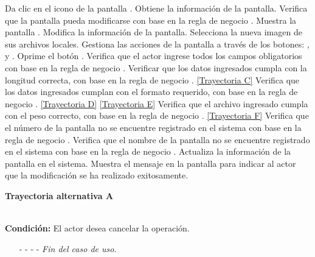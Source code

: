 	\begin{UCtrayectoria}
		\UCpaso[\UCactor] Da clic en el icono \editar de la pantalla .
		\UCpaso[\UCsist] Obtiene la información de la pantalla.
		\UCpaso[\UCsist] Verifica que la pantalla pueda modificarse con base en la regla de negocio . 
		\UCpaso[\UCsist] Muestra la pantalla . \label{CU11.2-P7}
		\UCpaso[\UCactor] Modifica la información de la pantalla. \label{CU11.2-P5}
		\UCpaso[\UCactor] Selecciona la nueva imagen de sus archivos locales. \label{CU11.2-P6}
		\UCpaso[\UCactor] Gestiona las acciones de la pantalla a través de los botones: , \editar y \eliminar.
		\UCpaso[\UCactor] Oprime el botón . 
		\UCpaso[\UCsist] Verifica que el actor ingrese todos los campos obligatorios con base en la regla de negocio . 
		\UCpaso[\UCsist] Verificar que los datos ingresados cumpla con la longitud correcta, con base en la regla de negocio . \hyperlink{CU11-2:TAC}{[Trayectoria C]}
		\UCpaso[\UCsist] Verifica que los datos ingresados cumplan con el formato requerido, con base en la regla de negocio . \hyperlink{CU11-2:TAD}{[Trayectoria D]} \hyperlink{CU11-2:TAC}{[Trayectoria E]}
		\UCpaso[\UCsist] Verifica que el archivo ingresado cumpla con el peso correcto, con base en la regla de negocio . \hyperlink{CU11-2:TAF}{[Trayectoria F]}
		\UCpaso[\UCsist] Verifica que el número de la pantalla no se encuentre registrado en el sistema con base en la regla de negocio . 
		\UCpaso[\UCsist] Verifica que el nombre de la pantalla no se encuentre registrado en el sistema con base en la regla de negocio .  
		\UCpaso[\UCsist] Actualiza la información de la pantalla en el sistema.
		\UCpaso[\UCsist] Muestra el mensaje  en la pantalla  para indicar al actor que la modificación se ha realizado exitosamente.
	\end{UCtrayectoria}		
\hypertarget{CU11-2:TAA}{\textbf{Trayectoria alternativa A}}\\
\noindent \textbf{Condición:} El actor desea cancelar la operación.
\begin{enumerate}
	\UCpaso[\UCactor] Solicita cancelar la operación oprimiendo el botón  de la pantalla .
	\UCpaso[\UCsist] Muestra la pantalla .
	\item[- -] - - {\em {Fin del caso de uso}}.%
\end{enumerate}
